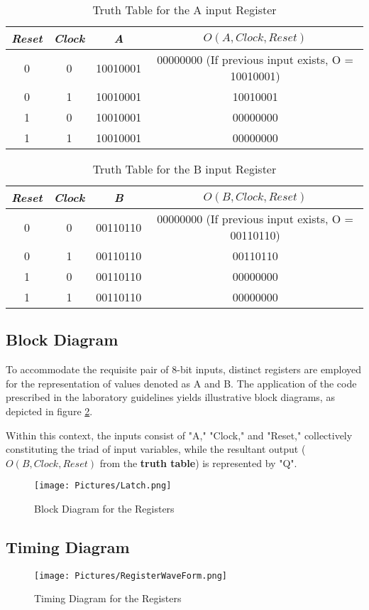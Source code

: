 	\begin{table}[H]
		\centering
		\begin{tabular}{|c|c|c|c|}
		\hline
		\hline
			\textit{Reset} & \textit{Clock} & \textit{A} & $O(A, Clock, Reset)$ \\ 
		\hline
		\hline
			0 & 0 & 10010001 & 00000000 (If previous input exists, O = 10010001) \\ 
			\hline
			0 & 1 & 10010001 & 10010001 \\ 
			\hline
			1 & 0 & 10010001 & 00000000 \\ 
			\hline
			1 & 1 & 10010001 & 00000000 \\ 
		\hline
		\hline
    		\end{tabular}
    		\caption{Truth Table for the A input Register}
	\end{table}
	
	\begin{table}[H]
		\centering
		\begin{tabular}{|c|c|c|c|}
		\hline
		\hline
			\textit{Reset} & \textit{Clock} & \textit{B} & $O(B, Clock, Reset)$ \\ 
		\hline
		\hline
			0 & 0 & 00110110 & 00000000 (If previous input exists, O = 00110110) \\ 
			\hline
			0 & 1 & 00110110 & 00110110 \\ 
			\hline
			1 & 0 & 00110110 & 00000000 \\ 
			\hline
			1 & 1 & 00110110 & 00000000 \\ 
		\hline
		\hline
    		\end{tabular}
    		\caption{Truth Table for the B input Register}
	\end{table}

\subsection{{Block Diagram}}

	{To accommodate the requisite pair of 8-bit inputs, distinct registers are employed for the representation of values denoted as A and B. The application of the code prescribed in the laboratory guidelines yields illustrative block diagrams, as depicted in figure \ref{Latch}.}
	
	{Within this context, the inputs consist of "A," "Clock," and "Reset," collectively constituting the triad of input variables, while the resultant output ($O(B, Clock, Reset)$ from the \textbf{truth table}) is represented by "Q".}

	\begin{figure}[H]
		\centering
		\texttt{[image: Pictures/Latch.png]}
		\caption{{Block Diagram for the Registers}}
		\label{Latch}
	\end{figure}


\subsection{{Timing Diagram}}

	{}

	\begin{figure}[H]
		\centering
		\texttt{[image: Pictures/RegisterWaveForm.png]}
		\caption{{Timing Diagram for the Registers}}
		\label{Latch}
	\end{figure}
